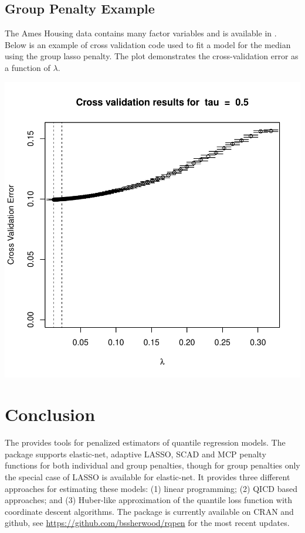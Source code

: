 \documentclass[article]{rqPenVignette}%
\begin{document}
\subsection{Group Penalty Example}
The Ames Housing data contains many factor variables and is available in . Below is an example of cross validation code used to fit a model for the median using the group lasso penalty. The plot demonstrates the cross-validation error as a function of $\lambda$. 
\begin{Schunk}
\end{Schunk}
\includegraphics{article-007}

\section{Conclusion}
The  provides tools for penalized estimators of quantile regression models. The package supports elastic-net, adaptive LASSO, SCAD and MCP penalty functions for both individual and group penalties, though for group penalties only the special case of LASSO is available for elastic-net. It provides three different approaches for estimating these models: (1) linear programming; (2) QICD based approaches; and (3) Huber-like approximation of the quantile loss function with coordinate descent algorithms. The package is currently available on CRAN and github, see \url{https://github.com/bssherwood/rqpen} for the most recent updates. 






\end{document}
